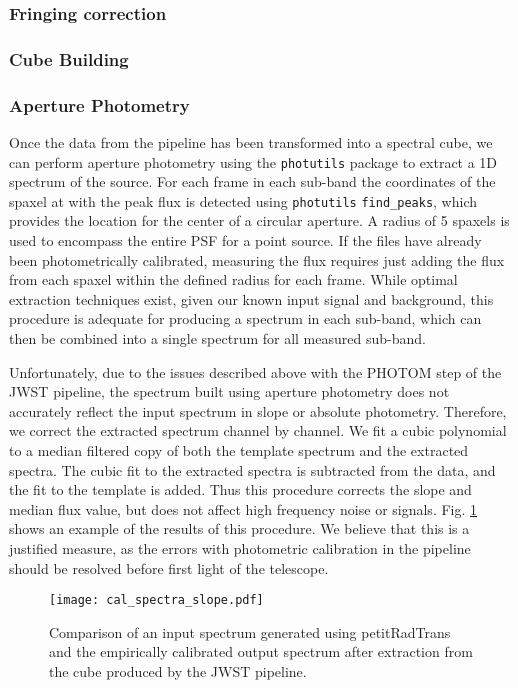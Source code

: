 \subsubsection{Fringing correction}
\cite{Carnall2017} %
\subsubsection{Cube Building}
\subsubsection{Aperture Photometry}
Once the data from the pipeline has been transformed into a spectral cube, we can perform aperture photometry using the \verb|photutils| package to extract a 1D spectrum of the source.
For each frame in each sub-band the coordinates of the spaxel at with the peak flux is detected using \verb|photutils| \verb|find_peaks|, which provides the location for the center of a circular aperture.
A radius of 5 spaxels is used to encompass the entire PSF for a point source.
If the files have already been photometrically calibrated, measuring the flux requires just adding the flux from each spaxel within the defined radius for each frame.
While optimal extraction techniques exist, given our known input signal and background, this procedure is adequate for producing a spectrum in each sub-band, which can then be combined into a single spectrum for all measured sub-band.

Unfortunately, due to the issues described above with the PHOTOM step of the JWST pipeline, the spectrum built using aperture photometry does not accurately reflect the input spectrum in slope or absolute photometry. 
Therefore, we correct the extracted spectrum channel by channel. 
We fit a cubic polynomial to a median filtered copy of both the template spectrum and the extracted spectra.
The cubic fit to the extracted spectra is subtracted from the data, and the fit to the template is added. 
Thus this procedure corrects the slope and median flux value, but does not affect high frequency noise or signals.
Fig. \ref{fig:cal} shows an example of the results of this procedure. 
We believe that this is a justified measure, as the errors with photometric calibration in the pipeline should be resolved before first light of the telescope.

\begin{figure}[h]
	\texttt{[image: cal\_spectra\_slope.pdf]}
	\caption{Comparison of an input spectrum generated using petitRadTrans and the empirically calibrated output spectrum after extraction from the cube produced by the JWST pipeline.}
	\label{fig:cal}
\end{figure}
